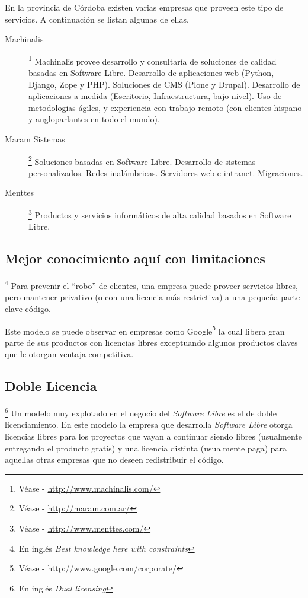 En la provincia de C\'ordoba existen varias empresas que proveen este tipo de
servicios. A continuaci\'on se listan algunas de ellas.

\begin{description}
 \item[Machinalis]\footnote{V\'ease - \url{http://www.machinalis.com/}}
Machinalis provee desarrollo y consultar\'ia de soluciones de calidad basadas
en Software Libre. Desarrollo de aplicaciones web (Python, Django, Zope y PHP).
Soluciones de CMS (Plone y Drupal). Desarrollo de aplicaciones a medida
(Escritorio, Infraestructura, bajo nivel). Uso de metodologias \'agiles, y
experiencia con trabajo remoto (con clientes hispano y angloparlantes
en todo el mundo). 

\item[Maram Sistemas]\footnote{V\'ease - \url{http://maram.com.ar/}} Soluciones
basadas en Software Libre. Desarrollo de sistemas personalizados. Redes
inal\'ambricas. Servidores web e intranet. Migraciones.

\item[Menttes]\footnote{V\'ease - \url{http://www.menttes.com/}} Productos y
servicios inform\'aticos de alta calidad basados en Software Libre.
 \end{description}

\subsection{Mejor conocimiento aqu\'i con limitaciones}\footnote{En
ingl\'es \emph{Best knowledge here with constraints}}
%
Para prevenir el ``robo'' de clientes, una empresa puede proveer servicios
libres, pero mantener privativo (o con una licencia m\'as restrictiva) a una
peque\~na parte clave c\'odigo.\

Este modelo se puede observar en empresas como Google\footnote{V\'ease -
\url{http://www.google.com/corporate/}} la cual libera gran parte de sus
productos con licencias libres exceptuando algunos productos claves que le
otorgan ventaja competitiva.


\subsection{Doble Licencia}\footnote{En ingl\'es \emph{Dual licensing}}
%
Un modelo muy explotado en el negocio del \emph{Software Libre} es el de doble
licenciamiento. En este modelo la empresa que desarrolla \emph{Software
Libre} otorga licencias libres para los proyectos que vayan a continuar siendo
libres (usualmente entregando el producto gratis) y una licencia distinta
(usualmente paga) para aquellas otras empresas que no deseen redistribuir el
c\'odigo. \\

